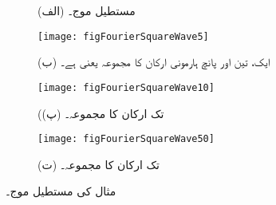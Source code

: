 \begin{figure}
\centering
\begin{subfigure}{0.5\textwidth}
\centering
{}
\caption*{(الف) مستطیل موج۔}
\end{subfigure}%
\begin{subfigure}{0.5\textwidth}
\centering
\texttt{[image: figFourierSquareWave5]}
\caption*{(ب) ایک، تین اور پانچ ہارمونی ارکان کا مجموعہ یعنی  ہے۔}
\end{subfigure}
\begin{subfigure}{0.5\textwidth}
\centering
\texttt{[image: figFourierSquareWave10]}
\caption*{((پ)  تک ارکان کا مجموعہ۔}
\end{subfigure}%
\begin{subfigure}{0.5\textwidth}
\centering
\texttt{[image: figFourierSquareWave50]}
\caption*{(ت)  تک ارکان کا مجموعہ۔}
\end{subfigure}
\caption{مثال  کی مستطیل موج۔}
\label{شکل_فوریئر_مستطیل_موج_الف}
\end{figure}

